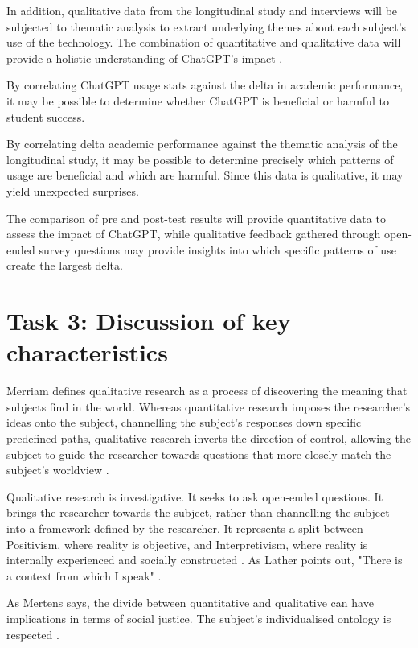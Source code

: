 \documentclass[12pt]{article}
\begin{document}
In addition, qualitative data from the longitudinal study and interviews will be subjected to thematic analysis to extract underlying themes about each subject's use of the technology. The combination of quantitative and qualitative data will provide a holistic understanding of ChatGPT's impact \cite{cresswell}.

By correlating ChatGPT usage stats against the delta in academic performance, it may be possible to determine whether ChatGPT is beneficial or harmful to student success. 

By correlating delta academic performance against the thematic analysis of the longitudinal study, it may be possible to determine precisely which patterns of usage are beneficial and which are harmful. Since this data is qualitative, it may yield unexpected surprises.

The comparison of pre and post-test results will provide quantitative data to assess the impact of ChatGPT, while qualitative feedback gathered through open-ended survey questions may provide insights into which specific patterns of use create the largest delta. 


\section{Task 3: Discussion of key characteristics}

Merriam defines qualitative research as a process of discovering the meaning that subjects find in the world. Whereas quantitative research imposes the researcher's ideas onto the subject, channelling the subject's responses down specific predefined paths, qualitative research inverts the direction of control, allowing the subject to guide the researcher towards questions that more closely match the subject's worldview \cite{merriam}.

Qualitative research is investigative. It seeks to ask open-ended questions. It brings the researcher towards the subject, rather than channelling the subject into a framework defined by the researcher. It represents a split between Positivism, where reality is objective, and Interpretivism, where reality is internally experienced and socially constructed \cite{michal}. As Lather points out, "There is a context from which I speak" \cite{lather}.

As Mertens says, the divide between quantitative and qualitative can have implications in terms of social justice. The subject's individualised ontology is respected \cite{mertens}.
\end{document}
